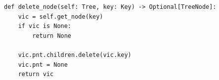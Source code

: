 \documentclass[mathserif, handout]{beamer}
\begin{document}
\begin{frame}[fragile]
  \begin{proofbox}
    \begin{lstlisting}[style=mypython]
def delete_node(self: Tree, key: Key) -> Optional[TreeNode]:
    vic = self.get_node(key)
    if vic is None:
        return None

    vic.pnt.children.delete(vic.key)
    vic.pnt = None
    return vic
\end{lstlisting}
  \end{proofbox}
\end{frame}
\end{document}
